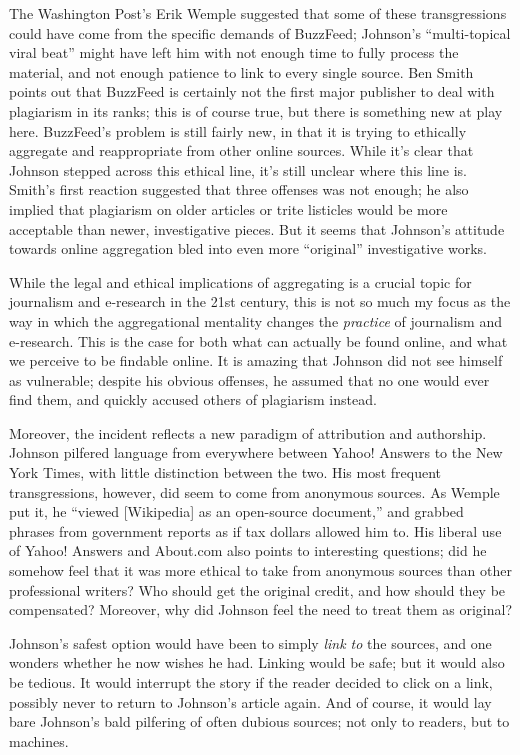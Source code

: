 The Washington Post's Erik Wemple suggested that some of these transgressions could have come from the specific demands of BuzzFeed; Johnson's ``multi-topical viral beat'' might have left him with not enough time to fully process the material, and not enough patience to link to every single source. Ben Smith points out that BuzzFeed is certainly not the first major publisher to deal with plagiarism in its ranks; this is of course true, but there is something new at play here. BuzzFeed's problem is still fairly new, in that it is trying to ethically aggregate and reappropriate from other online sources. While it's clear that Johnson stepped across this ethical line, it's still unclear where this line is. Smith's first reaction suggested that three offenses was not enough; he also implied that plagiarism on older articles or trite listicles would be more acceptable than newer, investigative pieces. But it seems that Johnson's attitude towards online aggregation bled into even more ``original'' investigative works.

While the legal and ethical implications of aggregating is a crucial topic for journalism and e-research in the 21st century, this is not so much my focus as the way in which the aggregational mentality changes the \emph{practice} of journalism and e-research. This is the case for both what can actually be found online, and what we perceive to be findable online. It is amazing that Johnson did not see himself as vulnerable; despite his obvious offenses, he assumed that no one would ever find them, and quickly accused others of plagiarism instead.

Moreover, the incident reflects a new paradigm of attribution and authorship. Johnson pilfered language from everywhere between Yahoo! Answers to the New York Times, with little distinction between the two. His most frequent transgressions, however, did seem to come from anonymous sources. As Wemple put it, he ``viewed [Wikipedia] as an open-source document,'' and grabbed phrases from government reports as if tax dollars allowed him to. His liberal use of Yahoo! Answers and About.com also points to interesting questions; did he somehow feel that it was more ethical to take from anonymous sources than other professional writers? Who should get the original credit, and how should they be compensated? Moreover, why did Johnson feel the need to treat them as original?

Johnson's safest option would have been to simply \emph{link to} the sources, and one wonders whether he now wishes he had. Linking would be safe; but it would also be tedious. It would interrupt the story if the reader decided to click on a link, possibly never to return to Johnson's article again. And of course, it would lay bare Johnson's bald pilfering of often dubious sources; not only to readers, but to machines.

